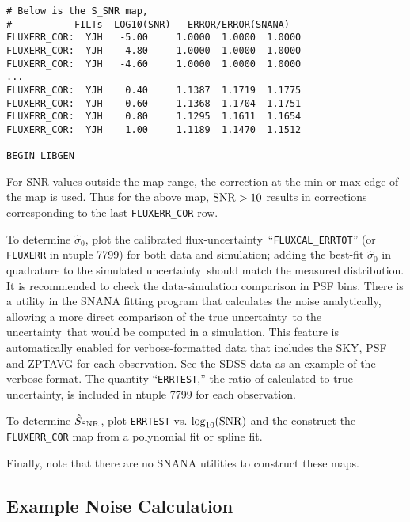 \documentclass[12pt]{article}
\newcommand{\unc}{uncertainty}
\newcommand{\obs}{observation}
\newcommand{\sigOFF}{\hat\sigma_0}
\newcommand{\SSNR}{\hat{S}_{\rm SNR}}
\newcommand{\logSNR}{\log_{10}({\rm SNR})}
\begin{document}
{\begin{Verbatim}[frame=single]
# Below is the S_SNR map,
#           FILTs  LOG10(SNR)   ERROR/ERROR(SNANA)
FLUXERR_COR:  YJH   -5.00     1.0000  1.0000  1.0000
FLUXERR_COR:  YJH   -4.80     1.0000  1.0000  1.0000
FLUXERR_COR:  YJH   -4.60     1.0000  1.0000  1.0000
...
FLUXERR_COR:  YJH    0.40     1.1387  1.1719  1.1775
FLUXERR_COR:  YJH    0.60     1.1368  1.1704  1.1751
FLUXERR_COR:  YJH    0.80     1.1295  1.1611  1.1654
FLUXERR_COR:  YJH    1.00     1.1189  1.1470  1.1512

BEGIN LIBGEN
\end{Verbatim}
%
For SNR values outside the map-range, the correction at the 
min or max edge of the map is used.
Thus for the above map, ${\rm SNR} > 10$ results in corrections
corresponding to the last {\tt FLUXERR\_COR} row.

\bigskip
To determine $\sigOFF$, plot the calibrated flux-\unc\ 
``{\tt FLUXCAL\_ERRTOT}'' (or {\tt FLUXERR} in ntuple 7799) 
for both data and simulation; 
adding the best-fit $\sigOFF$ in quadrature to the simulated \unc\ 
should match the measured distribution. It is recommended
to check the data-simulation comparison in PSF bins.
There is a utility in the SNANA fitting program that calculates 
the noise analytically,  allowing a more direct comparison
of the true \unc\ to the \unc\ that would be computed
in a simulation. This feature is automatically enabled
for verbose-formatted data that includes the SKY, PSF and
ZPTAVG for each \obs. See the SDSS data as an example
of the  verbose format. The quantity ``{\tt ERRTEST},''
the ratio of calculated-to-true \unc, is included
in ntuple 7799 for each \obs. 

To determine $\SSNR$, plot {\tt ERRTEST} vs. $\logSNR$
and the construct the {\tt FLUXERR\_COR} map from 
a polynomial fit or spline fit.

Finally, note that there are no SNANA utilities to
construct these maps.

   \clearpage
   \subsection{Example Noise Calculation}
   \label{subsec:noise_calc}

}
\end{document}
